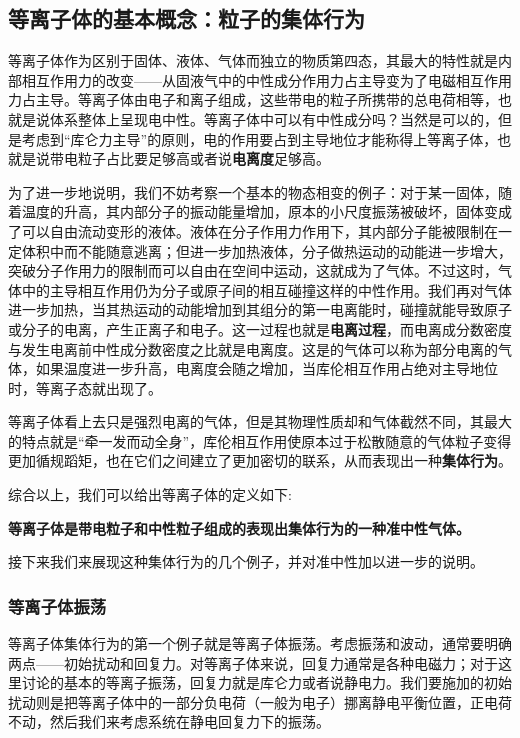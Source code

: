 
\subsection{等离子体的基本概念：粒子的集体行为}

等离子体作为区别于固体、液体、气体而独立的物质第四态，其最大的特性就是内部相互作用力的改变——从固液气中的中性成分作用力占主导变为了电磁相互作用力占主导。等离子体由电子和离子组成，这些带电的粒子所携带的总电荷相等，也就是说体系整体上呈现电中性。等离子体中可以有中性成分吗？当然是可以的，但是考虑到“库仑力主导”的原则，电的作用要占到主导地位才能称得上等离子体，也就是说带电粒子占比要足够高或者说\textbf{电离度}足够高。

为了进一步地说明，我们不妨考察一个基本的物态相变的例子：对于某一固体，随着温度的升高，其内部分子的振动能量增加，原本的小尺度振荡被破坏，固体变成了可以自由流动变形的液体。液体在分子作用力作用下，其内部分子能被限制在一定体积中而不能随意逃离；但进一步加热液体，分子做热运动的动能进一步增大，突破分子作用力的限制而可以自由在空间中运动，这就成为了气体。不过这时，气体中的主导相互作用仍为分子或原子间的相互碰撞这样的中性作用。我们再对气体进一步加热，当其热运动的动能增加到其组分的第一电离能时，碰撞就能导致原子或分子的电离，产生正离子和电子。这一过程也就是\textbf{电离过程}，而电离成分数密度与发生电离前中性成分数密度之比就是电离度。这是的气体可以称为部分电离的气体，如果温度进一步升高，电离度会随之增加，当库伦相互作用占绝对主导地位时，等离子态就出现了。

等离子体看上去只是强烈电离的气体，但是其物理性质却和气体截然不同，其最大的特点就是“牵一发而动全身”，库伦相互作用使原本过于松散随意的气体粒子变得更加循规蹈矩，也在它们之间建立了更加密切的联系，从而表现出一种\textbf{集体行为}。

综合以上，我们可以给出等离子体的定义如下:

\textbf{等离子体是带电粒子和中性粒子组成的表现出集体行为的一种准中性气体。}


接下来我们来展现这种集体行为的几个例子，并对准中性加以进一步的说明。

\subsubsection{等离子体振荡}

等离子体集体行为的第一个例子就是等离子体振荡。考虑振荡和波动，通常要明确两点——初始扰动和回复力。对等离子体来说，回复力通常是各种电磁力；对于这里讨论的基本的等离子振荡，回复力就是库仑力或者说静电力。我们要施加的初始扰动则是把等离子体中的一部分负电荷（一般为电子）挪离静电平衡位置，正电荷不动，然后我们来考虑系统在静电回复力下的振荡。

